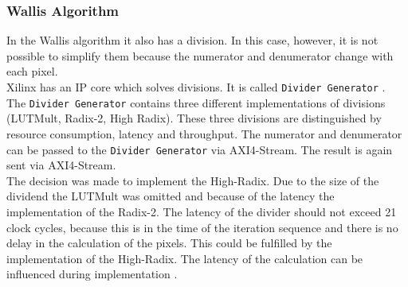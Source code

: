\subsubsection*{Wallis Algorithm}
In the Wallis algorithm it also has a division. In this case, however, it is not possible to simplify them because the numerator and denumerator change with each pixel. \\
Xilinx has an IP core which solves divisions. It is called \texttt{Divider Generator} \cite{divider}. The \texttt{Divider Generator} contains three different implementations of divisions (LUTMult, Radix-2, High Radix). These three divisions are distinguished by resource consumption, latency and throughput. The numerator and denumerator can be passed to the \texttt{Divider Generator} via AXI4-Stream. The result is again sent via AXI4-Stream. \\
The decision was made to implement the High-Radix. Due to the size of the dividend the LUTMult was omitted and because of the latency the implementation of the Radix-2. The latency of the divider should not exceed 21 clock cycles, because this is in the time of the iteration sequence and there is no delay in the calculation of the pixels. This could be fulfilled by the implementation of the High-Radix. The latency of the calculation can be influenced during implementation \cite{divider}.

